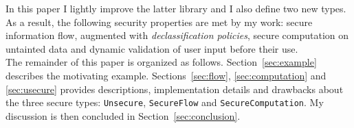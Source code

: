 In this paper I lightly improve the latter library and I also define two new types. As a result, the following security properties are met by my work: secure information flow, augmented with \textit{declassification policies}, secure computation on untainted data and dynamic validation of user input before their use. \\
The remainder of this paper is organized as follows. Section~\ref{sec:example} describes the motivating example. Sections~\ref{sec:flow}, \ref{sec:computation} and \ref{sec:usecure} provides descriptions, implementation details and drawbacks about the three secure types: \texttt{Unsecure}, \texttt{SecureFlow} and \texttt{SecureComputation}. My discussion is then concluded in Section~\ref{sec:conclusion}.